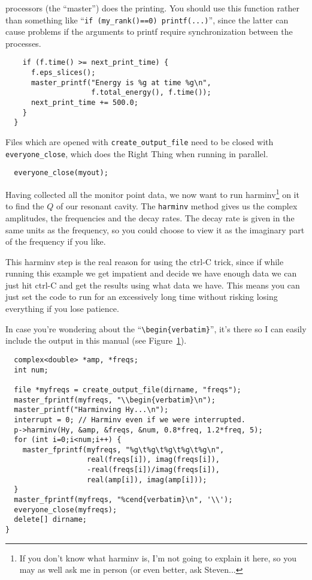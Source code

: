 processors (the ``master'') does the printing.  You should use this
function rather than something like
``\verb!if (my_rank()==0) printf(...)!'', since the latter can cause
problems if the arguments to printf require synchronization between the
processes.
\begin{verbatim}
    if (f.time() >= next_print_time) {
      f.eps_slices();
      master_printf("Energy is %g at time %g\n",
                    f.total_energy(), f.time());
      next_print_time += 500.0;
    }
  }
\end{verbatim}
Files which are opened with \verb!create_output_file! need to be closed
with \verb!everyone_close!, which does the Right Thing when running in
parallel.
\begin{verbatim}
  everyone_close(myout);
\end{verbatim}
Having collected all the monitor point data, we now want to run
harminv\footnote{If you don't know what harminv is, I'm not going to
explain it here, so you may as well ask me in person (or even better, ask
Steven...} on it to find the $Q$ of our resonant cavity.  The
\verb!harminv! method gives us the complex amplitudes, the frequencies and
the decay rates.  The decay rate is given in the same units as the
frequency, so you could choose to view it as the imaginary part of the
frequency if you like.

This harminv step is the real reason for using the ctrl-C trick, since if
while running this example we get impatient and decide we have enough data
we can just hit ctrl-C and get the results using what data we have.  This
means you can just set the code to run for an excessively long time without
risking losing everything if you lose patience.
\begin{figure}
\label{complicated_figure}
\begin{center}
\end{center}
\end{figure}

In case you're wondering about the ``\verb!\begin{verbatim}!'', it's there
so I can easily include the output in this manual (see
Figure~\ref{complicated_figure}).
\begin{verbatim}
  complex<double> *amp, *freqs;
  int num;
  
  file *myfreqs = create_output_file(dirname, "freqs");
  master_fprintf(myfreqs, "\\begin{verbatim}\n");
  master_printf("Harminving Hy...\n");
  interrupt = 0; // Harminv even if we were interrupted.
  p->harminv(Hy, &amp, &freqs, &num, 0.8*freq, 1.2*freq, 5);
  for (int i=0;i<num;i++) {
    master_fprintf(myfreqs, "%g\t%g\t%g\t%g\t%g\n",
                   real(freqs[i]), imag(freqs[i]),
                   -real(freqs[i])/imag(freqs[i]),
                   real(amp[i]), imag(amp[i]));
  }
  master_fprintf(myfreqs, "%cend{verbatim}\n", '\\');
  everyone_close(myfreqs);
  delete[] dirname;
}
\end{verbatim}